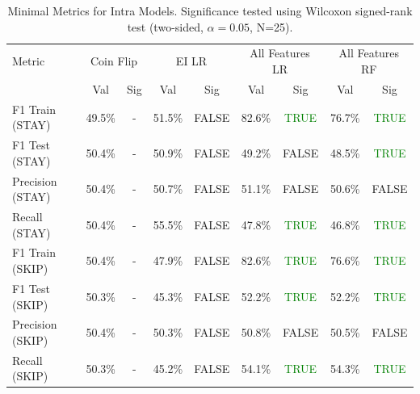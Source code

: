 \begin{table}[ht]
\centering
\begin{tabular}{lcccccccc}
\hline
Metric & \multicolumn{2}{c}{Coin Flip} & \multicolumn{2}{c}{EI LR} & \multicolumn{2}{c}{All Features LR} & \multicolumn{2}{c}{All Features RF} \\
 & Val & Sig & Val & Sig & Val & Sig & Val & Sig \\
\hline
F1 Train (STAY) & 49.5\% & - & 51.5\% & FALSE & 82.6\% & \textcolor{green}{TRUE} & 76.7\% & \textcolor{green}{TRUE} \\
F1 Test (STAY) & 50.4\% & - & 50.9\% & FALSE & 49.2\% & FALSE & 48.5\% & \textcolor{green}{TRUE} \\
Precision (STAY) & 50.4\% & - & 50.7\% & FALSE & 51.1\% & FALSE & 50.6\% & FALSE \\
Recall (STAY) & 50.4\% & - & 55.5\% & FALSE & 47.8\% & \textcolor{green}{TRUE} & 46.8\% & \textcolor{green}{TRUE} \\
F1 Train (SKIP) & 50.4\% & - & 47.9\% & FALSE & 82.6\% & \textcolor{green}{TRUE} & 76.6\% & \textcolor{green}{TRUE} \\
F1 Test (SKIP) & 50.3\% & - & 45.3\% & FALSE & 52.2\% & \textcolor{green}{TRUE} & 52.2\% & \textcolor{green}{TRUE} \\
Precision (SKIP) & 50.4\% & - & 50.3\% & FALSE & 50.8\% & FALSE & 50.5\% & FALSE \\
Recall (SKIP) & 50.3\% & - & 45.2\% & FALSE & 54.1\% & \textcolor{green}{TRUE} & 54.3\% & \textcolor{green}{TRUE} \\
\hline
\end{tabular}
\caption{Minimal Metrics for Intra Models. Significance tested using Wilcoxon signed-rank test (two-sided, $\alpha=0.05$, N=25).}
\label{tab:metrics_intra}
\end{table}